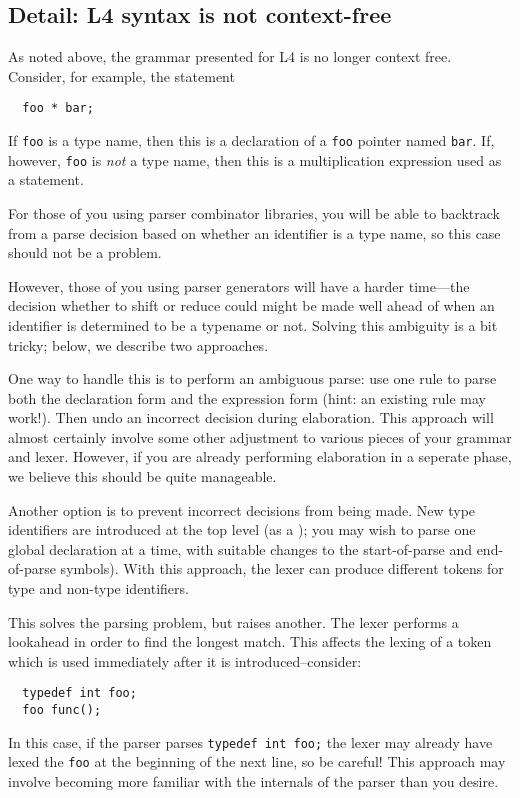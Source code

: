 \documentclass[11pt]{article}
\begin{document}
\subsection*{Detail:  L4 syntax is not context-free}

As noted above, the grammar presented for L4 is no longer context free.
Consider, for example, the statement
\begin{verbatim}
  foo * bar;
\end{verbatim}
If \verb"foo" is a type name, then this is a declaration of a
\verb"foo" pointer named \verb"bar". If, however, \verb"foo" is
\emph{not} a type name, then this is a multiplication expression used
as a statement.

For those of you using parser combinator libraries, you will be able
to backtrack from a parse decision based on whether an identifier is a
type name, so this case should not be a problem.

However, those of you using parser generators will have a harder
time---the decision whether to shift or reduce could might be made
well ahead of when an identifier is determined to be a typename or
not. Solving this ambiguity is a bit tricky; below, we describe two
approaches.

One way to handle this is to perform an ambiguous parse: use one rule
to parse both the declaration form and the expression form (hint: an
existing rule may work!). Then undo an incorrect decision during
elaboration. This approach will almost certainly involve some other
adjustment to various pieces of your grammar and lexer. However, if
you are already performing elaboration in a seperate phase, we believe
this should be quite manageable.

Another option is to prevent incorrect decisions from being made. New
type identifiers are introduced at the top level (as a
); you may wish to parse one global declaration at a
time, with suitable changes to the start-of-parse and end-of-parse
symbols). With this approach, the lexer can produce different tokens
for type and non-type identifiers.

This solves the parsing problem, but raises another. The lexer performs
a lookahead in order to find the longest match. This affects the lexing
of a token which is used immediately after it is introduced--consider:
\begin{verbatim}
  typedef int foo;
  foo func();
\end{verbatim}
In this case, if the parser parses \verb"typedef int foo;" the lexer
may already have lexed the \verb"foo" at the beginning of the next
line, so be careful! This approach may involve becoming more familiar
with the internals of the parser than you desire.
\end{document}
